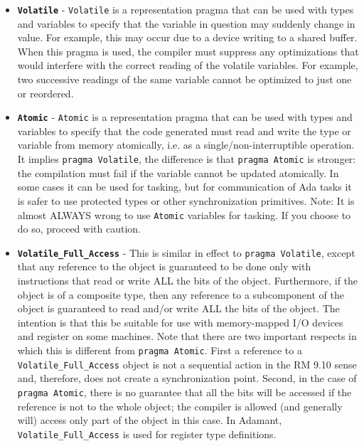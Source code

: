 \vspace{5mm} %
\begin{itemize}
  \item \texttt{\textbf{Volatile}} - \texttt{Volatile} is a representation pragma that can be used with types and variables to specify that the variable in question may suddenly change in value. For example, this may occur due to a device writing to a shared buffer. When this pragma is used, the compiler must suppress any optimizations that would interfere with the correct reading of the volatile variables. For example, two successive readings of the same variable cannot be optimized to just one or reordered. 
  \item \texttt{\textbf{Atomic}} - \texttt{Atomic} is a representation pragma that can be used with types and variables to specify that the code generated must read and write the type or variable from memory atomically, i.e. as a single/non-interruptible operation. It implies \texttt{pragma Volatile}, the difference is that \texttt{pragma Atomic} is stronger: the compilation must fail if the variable cannot be updated atomically. In some cases it can be used for tasking, but for communication of Ada tasks it is safer to use protected types or other synchronization primitives. Note: It is almost ALWAYS wrong to use \texttt{Atomic} variables for tasking. If you choose to do so, proceed with caution.
  \item \texttt{\textbf{Volatile\_Full\_Access}} - This is similar in effect to \texttt{pragma Volatile}, except that any reference to the object is guaranteed to be done only with instructions that read or write ALL the bits of the object. Furthermore, if the object is of a composite type, then any reference to a subcomponent of the object is guaranteed to read and/or write ALL the bits of the object. The intention is that this be suitable for use with memory-mapped I/O devices  and register on some machines. Note that there are two important respects in which this is different from \texttt{pragma Atomic}. First a reference to a \texttt{Volatile\_Full\_Access} object is not a sequential action in the RM 9.10 sense and, therefore, does not create a synchronization point. Second, in the case of \texttt{pragma Atomic}, there is no guarantee that all the bits will be accessed if the reference is not to the whole object; the compiler is allowed (and generally will) access only part of the object in this case. In Adamant, \texttt{Volatile\_Full\_Access} is used for register type definitions.
\end{itemize}
\vspace{5mm} %

